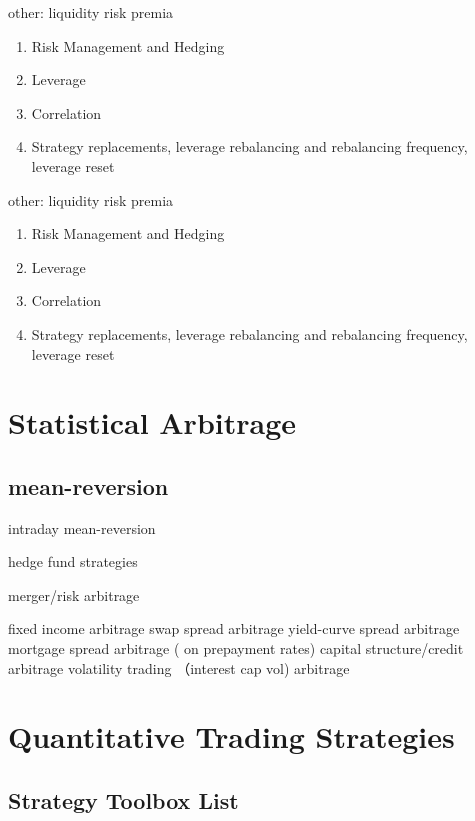 \documentclass[11pt, openany]{book}              %
\begin{document}
other: liquidity risk premia
\begin{enumerate}
 \item Risk Management and Hedging 
 \item Leverage 
 \item Correlation
 \item Strategy replacements, leverage rebalancing and rebalancing frequency, leverage reset
\end{enumerate}


other: liquidity risk premia
\begin{enumerate}
 \item Risk Management and Hedging 
 \item Leverage 
 \item Correlation
 \item Strategy replacements, leverage rebalancing and rebalancing frequency, leverage reset
\end{enumerate}

\chapter{Statistical Arbitrage}

\section{mean-reversion}

intraday mean-reversion

hedge fund strategies

  merger/risk arbitrage

   fixed income arbitrage
       swap spread arbitrage
       yield-curve spread arbitrage
      mortgage spread arbitrage ( on prepayment rates)
      capital structure/credit arbitrage 
      volatility trading （interest cap vol) arbitrage

\chapter{Quantitative Trading Strategies}


\section{Strategy Toolbox List}
\end{document}
